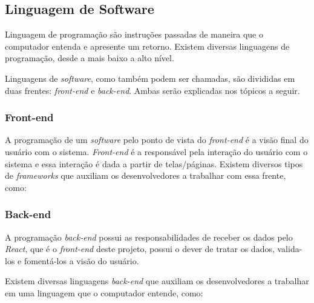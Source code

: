 \subsection{Linguagem de Software}

Linguagem de programação são instruções passadas de maneira que o computador entenda e apresente um retorno. Existem diversas linguagens de programação, desde a mais baixo a alto nível.

Linguagens de \textit{software}, como também podem ser chamadas, são divididas em duas frentes: \textit{front-end} e \textit{back-end}. Ambas serão explicadas nos tópicos a seguir.

\subsubsection{Front-end}
\label{sec:front-end}

A programação de um \textit{software} pelo ponto de vista do \textit{front-end} é a visão final do usuário com o sistema. \textit{Front-end} é a responsável pela interação do usuário com o sistema e essa interação é dada a partir de telas/páginas. Existem diversos tipos de \textit{frameworks} que auxiliam os desenvolvedores a trabalhar com essa frente, como:


\subsubsection{Back-end}
\label{sec:back-end}

A programação \textit{back-end} possui as responsabilidades de receber os dados pelo \textit{React}, que é o \textit{front-end} deste projeto, possui o dever de tratar os dados, valida-los e fomentá-los a visão do usuário.

Existem diversas linguagens \textit{back-end} que auxiliam os desenvolvedores a trabalhar em uma linguagem que o computador entende, como:


